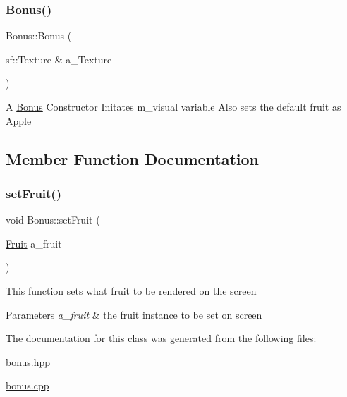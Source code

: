 \subsubsection{\texorpdfstring{Bonus()}{Bonus()}}
{\footnotesize\ttfamily Bonus\+::\+Bonus (\begin{DoxyParamCaption}\item[{sf\+::\+Texture \&}]{a\+\_\+\+Texture }\end{DoxyParamCaption})}

A \hyperlink{class_bonus}{Bonus} Constructor Initates m\+\_\+visual variable Also sets the default fruit as Apple 

\subsection{Member Function Documentation}
\mbox{\label{class_bonus_ad6b1650c30b01857ef003a6e9ebf4265}} 
\subsubsection{\texorpdfstring{set\+Fruit()}{setFruit()}}
{\footnotesize\ttfamily void Bonus\+::set\+Fruit (\begin{DoxyParamCaption}\item[{\hyperlink{class_bonus_a4325b797efccdaec4e373ceabbfc997f}{Fruit}}]{a\+\_\+fruit }\end{DoxyParamCaption})}

This function sets what fruit to be rendered on the screen


\begin{DoxyParams}{Parameters}
{\em a\+\_\+fruit} & the fruit instance to be set on screen \\
\hline
\end{DoxyParams}


The documentation for this class was generated from the following files\+:\begin{DoxyCompactItemize}
\item 
\hyperlink{bonus_8hpp}{bonus.\+hpp}\item 
\hyperlink{bonus_8cpp}{bonus.\+cpp}\end{DoxyCompactItemize}
